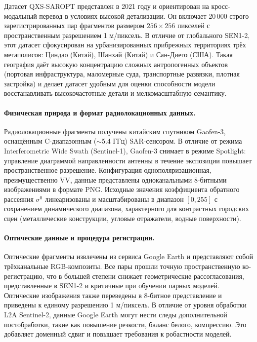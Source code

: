 Датасет QXS-SAROPT \cite{huang2021qxs} представлен в 2021 году и ориентирован на кросс-модальный перевод в условиях высокой детализации.
Он включает 20\,000 строго зарегистрированных пар фрагментов размером $256 \times 256$ пикселей с пространственным разрешением 1 м/пиксель.
В отличие от глобального SEN1-2, этот датасет сфокусирован на урбанизированных прибрежных территориях трёх мегаполисов: Циндао (Китай), Шанхай (Китай) и Сан-Диего (США).
Такая география даёт высокую концентрацию сложных антропогенных объектов (портовая инфраструктура, маломерные суда, транспортные развязки, плотная застройка) и делает датасет удобным для оценки способности модели восстанавливать высокочастотные детали и мелкомасштабную семантику.

\paragraph{Физическая природа и формат радиолокационных данных.}
Радиолокационные фрагменты получены китайским спутником Gaofen-3, оснащённым C-диапазонным ($\sim$5.4 ГГц) SAR-сенсором.
В отличие от режима Interferometric Wide Swath (Sentinel-1), Gaofen-3 снимает в режиме Spotlight: управление диаграммой направленности антенны в течение экспозиции повышает пространственное разрешение.
Конфигурация однополяризационная, преимущественно VV, данные представлены одноканальными 8-битными изображениями в формате PNG.
Исходные значения коэффициента обратного рассеяния $\sigma^0$ линеаризованы и масштабированы в диапазон $[0, 255]$ с сохранением динамического диапазона, характерного для контрастных городских сцен (металлические конструкции, угловые отражатели, водные поверхности).

\paragraph{Оптические данные и процедура регистрации.}
Оптические фрагменты извлечены из сервиса Google Earth и представляют собой трёхканальные RGB-композиты.
Все пары прошли точную пространственную ко-регистрацию, что в большей степени снижает геометрические рассогласования, представленные в SEN1-2 и критичные при обучении парных моделей.
Оптические изображения также переведены в 8-битное представление и приведены к единому разрешению 1 м/пиксель.
В отличие от уровня обработки L2A Sentinel-2, данные Google Earth могут нести следы дополнительной постобработки, такие как повышение резкости, баланс белого, компрессию. Это добавляет доменный сдвиг и повышает требования к робастности моделей.

